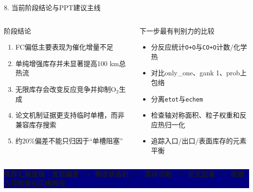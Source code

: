 \documentclass[aspectratio=169,11pt]{ctexbeamer}
\begin{document}
\begin{frame}{8. 当前阶段结论与PPT建议主线}
  \small
  \begin{columns}[T,totalwidth=\textwidth]
    \begin{block}{阶段结论}
      \begin{enumerate}
        \item FC偏低主要表现为催化增量不足
        \item 单纯增强库存并未显著提高100 km总热流
        \item 无限库存会改变反应竞争并抑制O$_2$生成
        \item 论文机制证据更支持临时单槽，而非兼容库存搜索
        \item 约20\%偏差不能只归因于“单槽阻塞”
      \end{enumerate}
    \end{block}
    \begin{block}{下一步最有判别力的比较}
      \begin{itemize}
        \item 分反应统计\texttt{O+O}与\texttt{CO+O}计数/化学热
        \item 对比only\_one、gank 1、prob上包络
        \item 分离\texttt{etot}与\texttt{echem}
        \item 检查轴对称面积、粒子权重和反应热归一化
        \item 追踪入口/出口/表面库存的元素平衡
      \end{itemize}
    \end{block}
  \end{columns}
  \vspace{0.08cm}
  \centering
  \colorbox{navy}{\parbox{0.91\textwidth}{\centering\color{white}\normalsize\bfseries
    推荐汇报逻辑：发现偏差 $\rightarrow$ 修改状态机 $\rightarrow$ 库存诊断 $\rightarrow$ 论文回查 $\rightarrow$ 收敛为可检验的后续假设}}
\end{frame}
\end{document}
